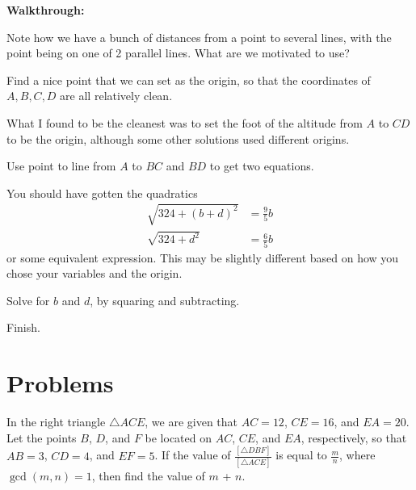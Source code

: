 \documentclass[11pt]{scrartcl}
\begin{document}
\textbf{Walkthrough:}
\begin{walk}


    \item Note how we have a bunch of distances from a point to several lines, with the point being on one of 2 parallel lines. What are we motivated to use?
    \item Find a nice point that we can set as the origin, so that the coordinates of $A,B,C,D$ are all relatively clean.
    
    What I found to be the cleanest was to set the foot of the altitude from $A$ to $CD$ to be the origin, although some other solutions used different origins. 
    
    \item Use point to line from $A$ to $BC$ and $BD$ to get two equations.
    
    You should have gotten the quadratics 
    \begin{align*}
        \sqrt{324+(b+d)^2}&=\frac{9}{5}b\\
        \sqrt{324+d^2}&=\frac{6}{5}b
    \end{align*}
    or some equivalent expression. This may be slightly different based on how you chose your variables and the origin. 
    \item Solve for $b$ and $d$, by squaring and subtracting. 
    \item Finish. 


\end{walk}

\pagebreak
\section{Problems}



\begin{problem}[AMC 10B 2004/18]
In the right triangle $\triangle ACE$, we are given that  $AC=12$, $CE=16$, and $EA=20$. Let the points $B$, $D$, and $F$ be located on $AC$, $CE$, and $EA$, respectively, so that $AB=3$, $CD=4$, and $EF=5$. If the value of $\frac{[\triangle DBF]}{[\triangle ACE]}$ is equal to $\frac{m}{n}$, where $\gcd(m,n)=1$, then find the value of $m$ + $n$.
\end{problem}
\end{document}
